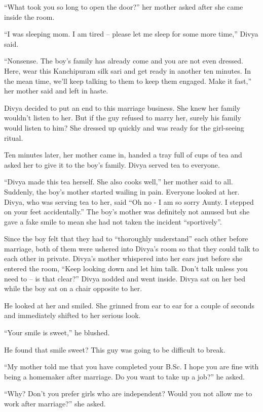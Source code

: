 “What took you so long to open the door?” her mother asked after she came inside
the room.

“I was sleeping mom. I am tired – please let me sleep for some more time,” Divya
said.

“Nonsense. The boy's family has already come and you are not even dressed. Here,
wear this Kanchipuram silk sari and get ready in another ten minutes. In the
mean time, we'll keep talking to them to keep them engaged. Make it fast,” her
mother said and left in haste.

Divya decided to put an end to this marriage business. She knew her family
wouldn't listen to her. But if the guy refused to marry her, surely his family
would listen to him? She dressed up quickly and was ready for the girl-seeing
ritual.

Ten minutes later, her mother came in, handed a tray full of cups of tea and
asked her to give it to the boy's family. Divya served tea to everyone.

“Divya made this tea herself. She also cooks well,” her mother said to all.
Suddenly, the boy's mother started wailing in pain. Everyone looked at her.
Divya, who was serving tea to her, said “Oh no - I am so sorry Aunty. I stepped
on your feet accidentally.” The boy's mother was definitely not amused but she
gave a fake smile to mean she had not taken the incident “sportively”.

Since the boy felt that they had to “thoroughly understand” each other before
marriage, both of them were ushered into Divya's room so that they could talk to
each other in private. Divya's mother whispered into her ears just before she
entered the room, “Keep looking down and let him talk. Don't talk unless you
need to – is that clear?” Divya nodded and went inside. Divya sat on her bed
while the boy sat on a chair opposite to her.

He looked at her and smiled. She grinned from ear to ear for a couple of seconds
and immediately shifted to her serious look.

“Your smile is sweet,” he blushed.

He found that smile sweet? This guy was going to be difficult to break.

“My mother told me that you have completed your B.Sc. I hope you are fine with
being a homemaker after marriage. Do you want to take up a job?” he asked.

“Why? Don't you prefer girls who are independent? Would you not allow me to work
after marriage?” she asked.

